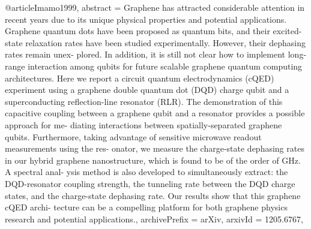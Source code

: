 @article{Imamo1999,
abstract = {Graphene has attracted considerable attention in recent years due to its unique physical properties and potential applications. Graphene quantum dots have been proposed as quantum bits, and their excited-state relaxation rates have been studied experimentally. However, their dephasing rates remain unex- plored. In addition, it is still not clear how to implement long-range interaction among qubits for future scalable graphene quantum computing architectures. Here we report a circuit quantum electrodynamics (cQED) experiment using a graphene double quantum dot (DQD) charge qubit and a superconducting reflection-line resonator (RLR). The demonstration of this capacitive coupling between a graphene qubit and a resonator provides a possible approach for me- diating interactions between spatially-separated graphene qubits. Furthermore, taking advantage of sensitive microwave readout measurements using the res- onator, we measure the charge-state dephasing rates in our hybrid graphene nanostructure, which is found to be of the order of GHz. A spectral anal- ysis method is also developed to simultaneously extract: the DQD-resonator coupling strength, the tunneling rate between the DQD charge states, and the charge-state dephasing rate. Our results show that this graphene cQED archi- tecture can be a compelling platform for both graphene physics research and potential applications.},
archivePrefix = {arXiv},
arxivId = {1205.6767},
}
